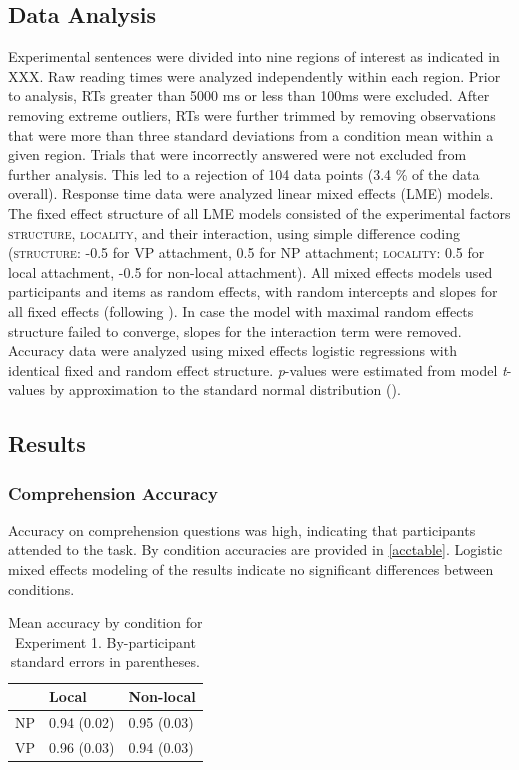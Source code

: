 \documentclass[12pt]{article}
\begin{document}
\subsection{Data Analysis}
\label{sec:analysis}

Experimental sentences were divided into nine regions of interest as indicated in XXX. Raw reading times were analyzed independently within each region. Prior to analysis, RTs greater than 5000 ms or less than 100ms were excluded. After removing extreme outliers, RTs were further trimmed by removing observations that were more than three standard deviations from a condition mean within a given region. Trials that were incorrectly answered were not excluded from further analysis. This led to a rejection of 104 data points (3.4 \% of the data overall). Response time data were analyzed linear mixed effects (LME) models. The fixed effect structure of all LME models consisted of the experimental factors \textsc{structure}, \textsc{locality}, and their interaction, using simple difference coding (\textsc{structure}: -0.5 for VP attachment,  0.5 for NP attachment;  \textsc{locality}: 0.5 for local attachment, -0.5 for non-local attachment). All mixed effects models used participants and items as random effects, with random intercepts and slopes for all fixed effects (following \cite{barr2013}). In case the model with maximal random effects structure failed to converge, slopes for the interaction term were removed. Accuracy data were analyzed using mixed effects logistic regressions with identical fixed and random effect structure. \textit{p}-values were estimated from model \textit{t}-values by approximation to the standard normal distribution (\cite{baayen2008}).   
  
\subsection{Results}
\label{sec:results}

\subsubsection{Comprehension Accuracy}
\label{sec:acc}

Accuracy on comprehension questions was high, indicating that participants attended to the task. By condition accuracies are provided in \ref{acctable}. Logistic mixed effects modeling of the results indicate no significant differences between conditions. 

\begin{table}[ht]
\centering
\begin{tabular}{rll}
  \hline
 & Local & Non-local \\ 
  \hline
NP & 0.94 (0.02) & 0.95 (0.03) \\ 
  VP & 0.96 (0.03) & 0.94 (0.03) \\ 
   \hline
\end{tabular}
\caption{Mean accuracy by condition for Experiment 1. By-participant standard errors in parentheses.} 
\end{table}
\end{document}
